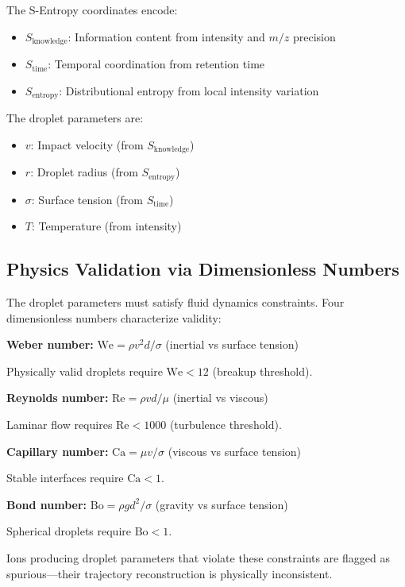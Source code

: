 \documentclass[12pt,a4paper]{article}
\theoremstyle{remark}
\begin{document}
The S-Entropy coordinates encode:
\begin{itemize}
    \item $S_{\text{knowledge}}$: Information content from intensity and $m/z$ precision
    \item $S_{\text{time}}$: Temporal coordination from retention time
    \item $S_{\text{entropy}}$: Distributional entropy from local intensity variation
\end{itemize}

The droplet parameters are:
\begin{itemize}
    \item $v$: Impact velocity (from $S_{\text{knowledge}}$)
    \item $r$: Droplet radius (from $S_{\text{entropy}}$)
    \item $\sigma$: Surface tension (from $S_{\text{time}}$)
    \item $T$: Temperature (from intensity)
\end{itemize}

\subsection{Physics Validation via Dimensionless Numbers}

The droplet parameters must satisfy fluid dynamics constraints. Four dimensionless numbers characterize validity:

\textbf{Weber number:} $\text{We} = \rho v^2 d / \sigma$ (inertial vs surface tension)

Physically valid droplets require $\text{We} < 12$ (breakup threshold).

\textbf{Reynolds number:} $\text{Re} = \rho v d / \mu$ (inertial vs viscous)

Laminar flow requires $\text{Re} < 1000$ (turbulence threshold).

\textbf{Capillary number:} $\text{Ca} = \mu v / \sigma$ (viscous vs surface tension)

Stable interfaces require $\text{Ca} < 1$.

\textbf{Bond number:} $\text{Bo} = \rho g d^2 / \sigma$ (gravity vs surface tension)

Spherical droplets require $\text{Bo} < 1$.

Ions producing droplet parameters that violate these constraints are flagged as spurious---their trajectory reconstruction is physically inconsistent.
\end{document}
